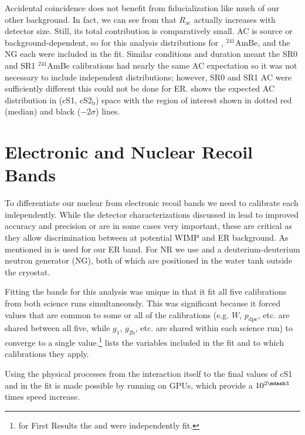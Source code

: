 Accidental coincidence does not benefit from fiducialization like much of our other background.  In fact, we can see from
 that $R_{\mathrm{ac}}$ actually increases
with detector size.  Still, its total contribution is comparatively small.  AC is source or background-dependent, so for this analysis
distributions for , $\mathrm{^{241}AmBe}$, and the NG each were included in the
fit.  Similar conditions and duration meant the SR0 and SR1 $^{241}$AmBe calibrations had nearly the same AC expectation so it was not
necessary to include independent distributions; however, SR0 and SR1 AC  were sufficiently different this could not be
done for ER.   shows the expected AC distribution in (cS1, cS2$_{\mathrm{b}}$) space
with the region of interest shown in dotted red (median) and black ($-2 \sigma$) lines.




\section{Electronic and Nuclear Recoil Bands}
\label{sec:er_nr_calibrations}
To differentiate our nuclear from electronic recoil bands we need to calibrate each independently.  While the detector characterizations
discussed in  lead to improved accuracy and precision or are in some cases very important, these are critical as
they allow discrimination between at potential WIMP and ER background.  As mentioned in
  is used for our ER band.  For NR we use  and a deuterium-deuterium
neutron generator (NG), both of which are positioned in the water tank outside the cryostat.

Fitting the bands for this analysis was unique in that it fit all five calibrations from both science runs simultaneously.  This was
significant because it forced values that are common to some or all of the calibrations (e.g. $W$, $p_{\mathrm{dpe}}$, etc. are shared
between all five, while $g_1$, $g_{2\mathrm{b}}$, etc. are shared within each science run) to converge to a single value.\footnote{for First Results
the \radoncal and \ambe were independently fit.}   lists the variables included in the fit and
to which calibrations they apply.



Using the physical processes from the interaction itself to the final values of cS1 and \cstwob in the fit is made
possible by running on GPUs, which provide a $10^{2 \mdash 3}$ times speed increase.



